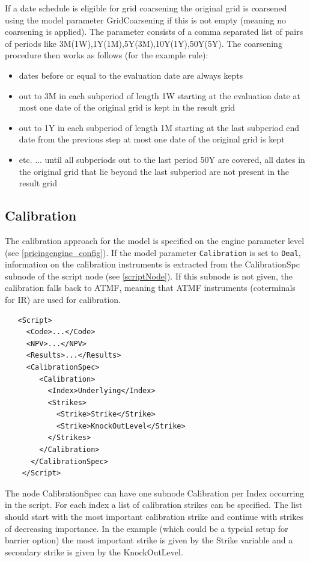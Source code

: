 If a date schedule is eligible for grid coarsening the original grid is coarsened using the model parameter
GridCoarsening if this is not empty (meaning no coarsening is applied). The parameter consists of a comma separated list
of pairs of periods like 3M(1W),1Y(1M),5Y(3M),10Y(1Y),50Y(5Y). The coarsening procedure then works as follows (for the
example rule):

\begin{itemize}
\item dates before or equal to the evaluation date are always kepts
\item out to 3M in each subperiod of length 1W starting at the evaluation date at most one date of the original grid is
  kept in the result grid
\item out to 1Y in each subperiod of length 1M starting at the last subperiod end date from the previous step at most
  one date of the original grid is kept
\item etc. ... until all subperiods out to the last period 50Y are covered, all dates in the original grid that lie
  beyond the last subperiod are not present in the result grid
\end{itemize}

\subsection{Calibration}\label{calibration}

The calibration approach for the model is specified on the engine parameter level (see \ref{pricingengine_config}). If
the model parameter \verb+Calibration+ is set to \verb+Deal+, information on the calibration instruments is extracted
from the CalibrationSpc subnode of the script node (see \ref{scriptNode}). If this subnode is not given, the calibration
falls back to ATMF, meaning that ATMF instruments (coterminals for IR) are used for calibration.

\begin{verbatim}
   <Script>
     <Code>...</Code>
     <NPV>...</NPV>
     <Results>...</Results>
     <CalibrationSpec>
        <Calibration>
          <Index>Underlying</Index>
          <Strikes>
            <Strike>Strike</Strike>
            <Strike>KnockOutLevel</Strike>
          </Strikes>
        </Calibration>
      </CalibrationSpec>
    </Script>
\end{verbatim}

The node CalibrationSpec can have one subnode Calibration per Index occurring in the script. For each index a list of
calibration strikes can be specified. The list should start with the most important calibration strike and continue with
strikes of decreasing importance. In the example (which could be a typcial setup for barrier option) the most important
strike is given by the Strike variable and a secondary strike is given by the KnockOutLevel.

